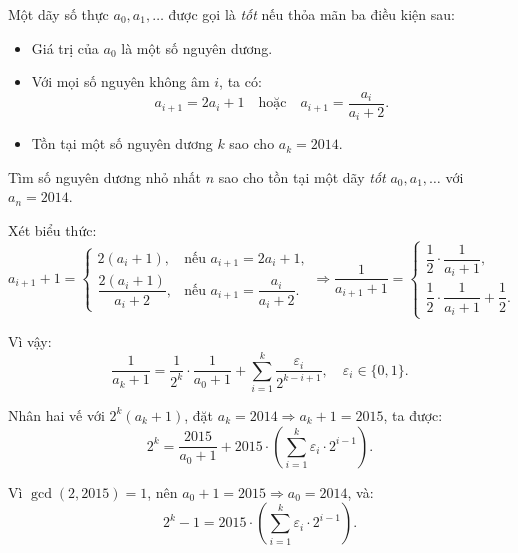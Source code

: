 \ifshowproblemandsoln
\ifshowproblem\begin{problem}\label{problem:APMO-2015-P3}\fi
\ifshowsoln\begin{problem}\fi
    Một dãy số thực \( a_0, a_1, \ldots \) được gọi là \textit{tốt} nếu thỏa mãn ba điều kiện sau:
    \begin{itemize}[topsep=0pt, partopsep=0pt, itemsep=0pt]
        \item Giá trị của \( a_0 \) là một số nguyên dương.
        \item Với mọi số nguyên không âm \( i \), ta có:
        \[
            a_{i+1} = 2a_i + 1 \quad \text{hoặc} \quad a_{i+1} = \frac{a_i}{a_i + 2}.
        \]
        \item Tồn tại một số nguyên dương \( k \) sao cho \( a_k = 2014 \).
    \end{itemize}

    Tìm số nguyên dương nhỏ nhất \( n \) sao cho tồn tại một dãy \textit{tốt} \( a_0, a_1, \ldots \) với \( a_n = 2014 \).
\end{problem}
\fi

\ifshowsoln
\begin{soln}\footnotemark
    Xét biểu thức:
    \[
        a_{i+1} + 1 = 
        \begin{cases}
            2(a_i + 1), &\text{nếu } a_{i+1} = 2a_i + 1, \\
            \dfrac{2(a_i + 1)}{a_i + 2}, &\text{nếu } a_{i+1} = \dfrac{a_i}{a_i + 2}.
        \end{cases}
    \Rightarrow \dfrac{1}{a_{i+1} + 1} = 
        \begin{cases}
            \dfrac{1}{2} \cdot \dfrac{1}{a_i + 1}, \\
            \dfrac{1}{2} \cdot \dfrac{1}{a_i + 1} + \dfrac{1}{2}.
        \end{cases}
    \]

    Vì vậy:
    \[
        \dfrac{1}{a_k + 1} = \dfrac{1}{2^k} \cdot \dfrac{1}{a_0 + 1} + \sum_{i=1}^k \dfrac{\varepsilon_i}{2^{k - i + 1}}, \quad \varepsilon_i \in \{0, 1\}.
    \]

    Nhân hai vế với \( 2^k(a_k + 1) \), đặt \( a_k = 2014 \Rightarrow a_k + 1 = 2015 \), ta được:
    \[
        2^k = \dfrac{2015}{a_0 + 1} + 2015 \cdot \left( \sum_{i=1}^k \varepsilon_i \cdot 2^{i - 1} \right).
    \]

    Vì \( \gcd(2, 2015) = 1 \), nên \( a_0 + 1 = 2015 \Rightarrow a_0 = 2014 \), và:
    \[
        2^k - 1 = 2015 \cdot \left( \sum_{i=1}^k \varepsilon_i \cdot 2^{i - 1} \right).
    \]


\end{soln}
\end{problem}
